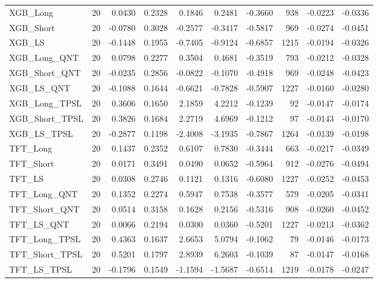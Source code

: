 \begin{tabular}{llrrrrrrrr}
\cline{1-10}
XGB\_Long & 20 & 0.0430 & 0.2328 & 0.1846 & 0.2481 & -0.3660 & 938 & -0.0223 & -0.0336 \\
\cline{1-10}
XGB\_Short & 20 & -0.0780 & 0.3028 & -0.2577 & -0.3417 & -0.5817 & 969 & -0.0274 & -0.0451 \\
\cline{1-10}
XGB\_LS & 20 & -0.1448 & 0.1955 & -0.7405 & -0.9124 & -0.6857 & 1215 & -0.0194 & -0.0326 \\
\cline{1-10}
XGB\_Long\_QNT & 20 & 0.0798 & 0.2277 & 0.3504 & 0.4681 & -0.3519 & 793 & -0.0212 & -0.0328 \\
\cline{1-10}
XGB\_Short\_QNT & 20 & -0.0235 & 0.2856 & -0.0822 & -0.1070 & -0.4918 & 969 & -0.0248 & -0.0423 \\
\cline{1-10}
XGB\_LS\_QNT & 20 & -0.1088 & 0.1644 & -0.6621 & -0.7828 & -0.5907 & 1227 & -0.0160 & -0.0280 \\
\cline{1-10}
XGB\_Long\_TPSL & 20 & 0.3606 & 0.1650 & 2.1859 & 4.2212 & -0.1239 & 92 & -0.0147 & -0.0174 \\
\cline{1-10}
XGB\_Short\_TPSL & 20 & 0.3826 & 0.1684 & 2.2719 & 4.6969 & -0.1212 & 97 & -0.0143 & -0.0170 \\
\cline{1-10}
XGB\_LS\_TPSL & 20 & -0.2877 & 0.1198 & -2.4008 & -3.1935 & -0.7867 & 1264 & -0.0139 & -0.0198 \\
\cline{1-10}
TFT\_Long & 20 & 0.1437 & 0.2352 & 0.6107 & 0.7830 & -0.3444 & 663 & -0.0217 & -0.0349 \\
\cline{1-10}
TFT\_Short & 20 & 0.0171 & 0.3491 & 0.0490 & 0.0652 & -0.5964 & 912 & -0.0276 & -0.0494 \\
\cline{1-10}
TFT\_LS & 20 & 0.0308 & 0.2746 & 0.1121 & 0.1316 & -0.6080 & 1227 & -0.0252 & -0.0453 \\
\cline{1-10}
TFT\_Long\_QNT & 20 & 0.1352 & 0.2274 & 0.5947 & 0.7538 & -0.3577 & 579 & -0.0205 & -0.0341 \\
\cline{1-10}
TFT\_Short\_QNT & 20 & 0.0514 & 0.3158 & 0.1628 & 0.2156 & -0.5316 & 908 & -0.0260 & -0.0452 \\
\cline{1-10}
TFT\_LS\_QNT & 20 & 0.0066 & 0.2194 & 0.0300 & 0.0360 & -0.5201 & 1227 & -0.0213 & -0.0362 \\
\cline{1-10}
TFT\_Long\_TPSL & 20 & 0.4363 & 0.1637 & 2.6653 & 5.0794 & -0.1062 & 79 & -0.0146 & -0.0173 \\
\cline{1-10}
TFT\_Short\_TPSL & 20 & 0.5201 & 0.1797 & 2.8939 & 6.2603 & -0.1039 & 87 & -0.0147 & -0.0168 \\
\cline{1-10}
TFT\_LS\_TPSL & 20 & -0.1796 & 0.1549 & -1.1594 & -1.5687 & -0.6514 & 1219 & -0.0178 & -0.0247 \\

\end{tabular}
